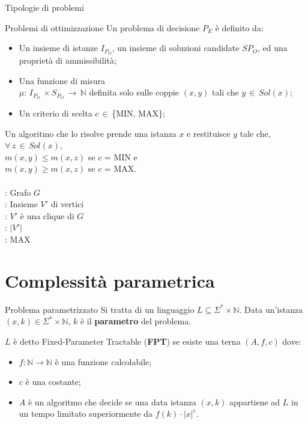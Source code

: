 \documentclass[10pt,a4paper]{article}
\begin{document}
\begin{multicols}{3}
\begin{textbox}{Tipologie di problemi}
\begin{textbox}{Problemi di ottimizzazione}
Un problema di decisione \(P_E\) è definito da:
\begin{itemize}[leftmargin=*]
    \item Un insieme di istanze \(I_{P_O}\), un insieme di soluzioni candidate  \(S{P_O}\), ed una proprietà di ammissibilità;
    \item Una funzione di misura \\\(\mu:\,I_{P_O}\,\times S_{P_O}\,\rightarrow\,\mathbb{N} \)
    definita solo sulle coppie \((x,y)\) tali che \(y\,\in\,Sol(x)\);
    \item Un criterio di scelta \(c\,\in\,\)\{MIN, MAX\};
\end{itemize}
Un algoritmo che lo risolve prende
una istanza \(x\) e restituisce \(y\) tale
che,\\ \(\forall\,z\,\in\,Sol(x)\), \\
\(m(x,y) \leq m(x,z)\) se \(c\) = MIN e \\
\(m(x,y) \geq m(x,z)\) se \(c\) = MAX.\\
\\
: Grafo \(G\)\\
: Insieme \(V'\) di vertici \\
: \(V'\) è una clique di \(G\)\\
: \(|V'|\) \\
: MAX
\end{textbox}

\end{textbox}




\section{Complessità parametrica}

\begin{textbox}{Problema parametrizzato}
Si tratta di un linguaggio \(L \subseteq \Sigma^\ast \times \mathbb{N}\).
Data un’istanza \((x,k) \in \Sigma^\ast \times \mathbb{N}\), \(k\) è
il \textbf{parametro} del problema.

\(L\) è detto Fixed-Parameter Tractable (\textbf{FPT}) se esiste una terna \((A,f,c)\) dove:
\begin{itemize}[leftmargin=*]
    \item \(f:\mathbb{N} \rightarrow \mathbb{N}\) è una funzione calcolabile;
    \item \(c\) è una costante;
    \item \(A\) è un algoritmo che decide se una data istanza \((x,k)\) appartiene ad \(L\) in un tempo limitato superiormente da \(f(k)\cdot|x|^c\).
\end{itemize}


\end{textbox}
\end{multicols}
\end{document}
